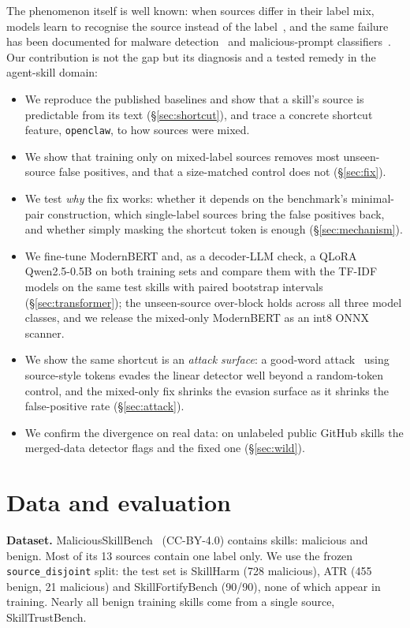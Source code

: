 \documentclass[conference]{IEEEtran}
\begin{document}
The phenomenon itself is well known: when sources differ in their label mix, models learn to recognise the
source instead of the label~\cite{torralba2011,gururangan2018,geirhos2020,zech2018,compton2023}, and the same
failure has been documented for malware detection~\cite{arp2022} and malicious-prompt
classifiers~\cite{fomin2026}. Our contribution is not the gap but its diagnosis and a tested remedy in the
agent-skill domain:
\begin{itemize}
\item We reproduce the published baselines and show that a skill's source is predictable from its text
(\S\ref{sec:shortcut}), and trace a concrete shortcut feature, \texttt{openclaw}, to how sources were mixed.
\item We show that training only on mixed-label sources removes most unseen-source false positives, and that a
size-matched control does not (\S\ref{sec:fix}).
\item We test \emph{why} the fix works: whether it depends on the benchmark's minimal-pair construction,
which single-label sources bring the false positives back, and whether simply masking the shortcut token is
enough (\S\ref{sec:mechanism}).
\item We fine-tune ModernBERT and, as a decoder-LLM check, a QLoRA Qwen2.5-0.5B on both training sets and
compare them with the TF-IDF models on the same test skills with paired bootstrap intervals
(\S\ref{sec:transformer}); the unseen-source over-block holds across all three model classes, and we
release the mixed-only ModernBERT as an int8 ONNX scanner.
\item We show the same shortcut is an \emph{attack surface}: a good-word attack~\cite{lowd2005} using
source-style tokens evades the linear detector well beyond a random-token control, and the mixed-only fix
shrinks the evasion surface as it shrinks the false-positive rate (\S\ref{sec:attack}).
\item We confirm the divergence on real data: on \WildN{} unlabeled public GitHub skills the merged-data
detector flags \WildFlaggedAll{} and the fixed one \WildFlaggedMixed{} (\S\ref{sec:wild}).
\end{itemize}

\section{Data and evaluation}
\label{sec:data}
\textbf{Dataset.} MaliciousSkillBench~\cite{msb2026} (CC-BY-4.0) contains \DataSkills{} skills:
\DataMalicious{} malicious and \DataBenign{} benign. Most of its 13 sources contain one label only.
We use the frozen \texttt{source\_disjoint} split: the test set is SkillHarm (728 malicious), ATR (455 benign,
21 malicious) and SkillFortifyBench (90/90), none of which appear in training. Nearly all benign training
skills come from a single source, SkillTrustBench.
\end{document}

